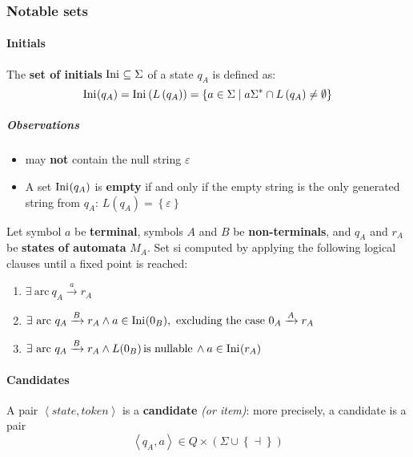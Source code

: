 \documentclass[english]{article}
\begin{document}
\subsubsection{Notable sets}

\paragraph{Initials}

\begin{definition}
  The \textbf{set of initials} \(\text{Ini}\hspace{0.1ex} \subseteq \Sigma\) of a state \(q_A\) is defined as:
  \[ \text{Ini}\hspace{0.1ex}(q_A) = \text{Ini}\hspace{0.1ex}\left( L\left( q_A \right) \right) = \left\{ a \in \Sigma \mid a \Sigma^\ast \cap L\left( q_A \right) \neq \emptyset \right\} \]
\end{definition}

\subparagraph*{Observations}
\begin{itemize}
  \item \Ini may \textbf{not} contain the null string \(\varepsilon\)
  \item A set \(\text{Ini}\hspace{0.1ex}(q_A)\) is \textbf{empty} if and only if the empty string is the only generated string from \(q_A\): \(L\left( q_A \right) = \left\{ \varepsilon \right\}\)
\end{itemize}

\bigskip
Let symbol \(a\) be \textbf{terminal}, symbols \(A\) and \(B\) be \textbf{non-terminals}, and \(q_A\) and \(r_A\) be \textbf{states of automata} \(M_A\).
Set \Ini si computed by applying the following logical clauses until a fixed point is reached:

\begin{enumerate}
  \item \(\exists \ \text{arc} \ q_A \xrightarrow{a} r_A\)
  \item \(\exists \ \text{arc} \ q_A \xrightarrow{B} r_A \land a \in \Ini(0_B), \ \text{excluding the case} \ 0_A \xrightarrow{A} r_A\)
  \item \(\exists \ \text{arc} \ q_A \xrightarrow{B} r_A \land L(0_B) \, \text{is nullable} \, \land a \in \text{Ini}\hspace{0.1ex}(r_A)\)
\end{enumerate}

\paragraph{Candidates}
\label{par:candidates}

\begin{definition}[Candidate]
  A pair \(\left\langle \textit{state}, \textit{token} \right\rangle\) is a \textbf{candidate} \textit{(or item)}:
  more precisely, a candidate is a pair
  \[ \left\langle q_A, a \right\rangle \in Q \times \left( \Sigma \cup \left\{ \dashv \right\} \right) \]
\end{definition}
\end{document}
